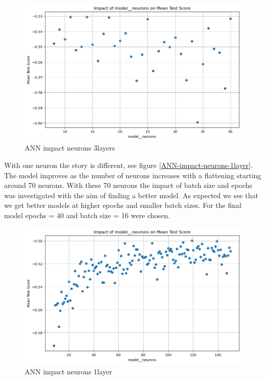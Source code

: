 \documentclass{article}
\begin{document}
\begin{figure}
	\centering
	\includegraphics[width=\linewidth]{figures/ANN_impact_neurons_3layers.png}
	\caption{ANN impact neurons 3layers}
	\label{fig:ANN-impact-neurons-3layers}
\end{figure}

With one neuron the story is different, see figure \ref{ANN-impact-neurons-1layer}. The model improves as the number of neurons increases with a flattening starting around 70 neurons. With these 70 neurons the impact of batch size and epochs was investigated with the aim of finding a better model.
As expected we see that we get better models at higher epochs and smaller batch sizes. For the final model epochs = 40 and batch size = 16 were chosen.

\begin{figure}
	\centering
	\includegraphics[width=\linewidth]{figures/ANN_impact_neurons_1layer.png}
	\caption{ANN impact neurons 1layer}
	\label{fig:ANN-impact-neurons-1layer}
\end{figure}
\end{document}
